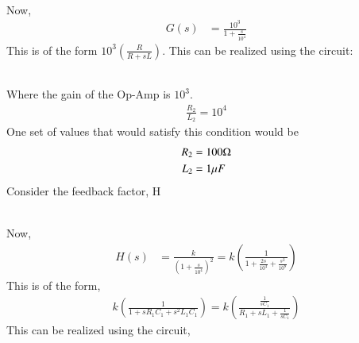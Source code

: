\begin{enumerate}[label=\thesection.\arabic*.,ref=\thesection.\theenumi]
\begin{figure}[!ht]
\begin{center}
	\end{center}
\caption{}
\label{fig:ee18btech11006_4}
\end{figure} \\
Now, 
\begin{align}
G(s)&= \frac{10^3}{1+\frac{s}{10^4}}
\end{align}
This is of the form $10^3 \left(\frac{R}{R+sL}\right)$.
This can be realized using the circuit:
\begin{figure}[!ht]
	\begin{center}
		\resizebox{\columnwidth}{!}{}
	\end{center}
\caption{}
\label{fig:ee18btech11006_3}
\end{figure} \\
Where the gain of the Op-Amp is $10^3$.
\begin{align}
    \frac{R_2}{L_2}=10^4
\end{align}
One set of values that would satisfy this condition would be 
\begin{align}
    R_2&= 100\ohm \\
    L_2&=1 \mu F
\end{align}
Consider the feedback factor, H \newline
\begin{figure}[!ht]
	\begin{center}
		\resizebox{\columnwidth}{!}{}
	\end{center}
\caption{}
\label{fig:ee18btech11006_5}
\end{figure} \\
Now, 
\begin{align}
H(s)&= \frac{k}{\left(1+\frac{s}{10^4}\right)^2} = k\left({\frac{1}{1+\frac{2s}{10^4}+\frac{s^2}{10^8}}}\right)  
\end{align}
This is of the form,
\begin{align}
k\left(\frac{1}{1+s{R_1}{C_1}+{s^2}{L_1}{C_1}}\right) =  k\left(\frac{\frac{1}{s{C_1}}}{{R_1}+s{L_1}+\frac{1}{s{C_1}}}\right)  
\end{align}
This can be realized using the circuit,
\begin{figure}[!ht]
	\begin{center}
		\resizebox{\columnwidth}{!}{}
	\end{center}
\caption{}
\label{fig:ee18btech11006_2}
\end{figure} \\

\end{enumerate}

